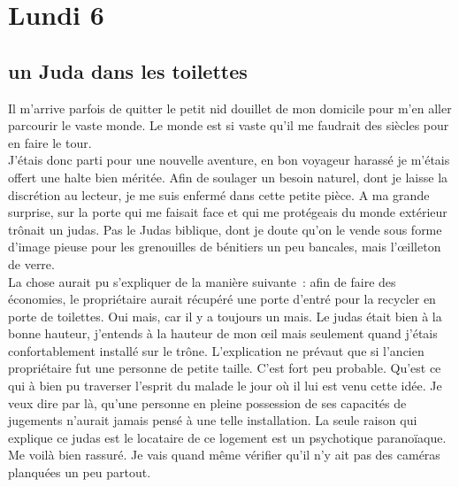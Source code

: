﻿\section*{Lundi 6}
\subsection*{un Juda dans les toilettes}
Il m’arrive parfois de quitter le petit nid douillet de mon domicile pour m’en aller parcourir le vaste monde. Le monde est si vaste qu’il me faudrait des siècles pour en faire le tour. \\
J’étais donc parti pour une nouvelle aventure, en bon voyageur harassé je m’étais offert une halte bien méritée. Afin de soulager un besoin naturel, dont je laisse la discrétion au lecteur, je me suis enfermé dans cette petite pièce. A ma grande surprise, sur la porte qui me faisait face et qui me protégeais du monde extérieur trônait un judas. Pas le Judas biblique, dont je doute qu’on le vende sous forme d’image pieuse pour les grenouilles de bénitiers un peu bancales, mais l’œilleton de verre. \\
La chose aurait pu s’expliquer de la manière suivante : afin de faire des économies, le propriétaire aurait récupéré une porte d’entré pour la recycler en porte de toilettes. Oui mais, car il y a toujours un mais. Le judas était bien à la bonne hauteur, j’entends à la hauteur de mon œil mais seulement quand j’étais confortablement installé sur le trône. L’explication ne prévaut que si l’ancien propriétaire fut une personne de petite taille. C’est fort peu probable. 
Qu’est ce qui à bien pu traverser l’esprit du malade le jour où il lui est venu cette idée. Je veux dire par là, qu’une personne en pleine possession de ses capacités de jugements n’aurait jamais pensé à une telle installation. La seule raison qui explique ce judas est le locataire de ce logement est un psychotique paranoïaque. \\
Me voilà bien rassuré. Je vais quand même vérifier qu’il n’y ait pas des caméras planquées un peu partout.
